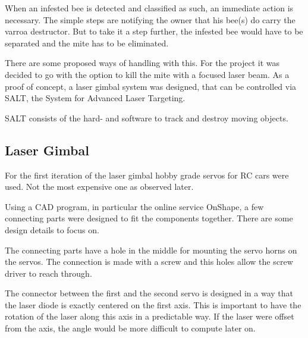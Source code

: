 \documentclass[a4paper,titlepage]{article}
\begin{document}
When an infested bee is detected and classified as such, an immediate action is necessary.
The simple steps are notifying the owner that his bee(s) do carry the varroa destructor.
But to take it a step further, the infested bee would have to be separated and the mite has to be eliminated.

There are some proposed ways of handling with this.
For the project it was decided to go with the option to kill the mite with a focused laser beam.
As a proof of concept, a laser gimbal system was designed, that can be controlled via SALT, the System for Advanced Laser Targeting.

SALT consists of the hard- and software to track and destroy moving objects.

\subsection{Laser Gimbal}

For the first iteration of the laser gimbal hobby grade servos for RC cars were used.
Not the most expensive one as observed later.

Using a CAD program, in particular the online service OnShape, a few connecting parts were designed to fit the components together.
There are some design details to focus on.

The connecting parts have a hole in the middle for mounting the servo horns on the servos.
The connection is made with a screw and this holes allow the screw driver to reach through.

The connector between the first and the second servo is designed in a way that the laser diode is exactly centered on the first axis.
This is important to have the rotation of the laser along this axis in a predictable way.
If the laser were offset from the axis, the angle would be more difficult to compute later on.
\end{document}
